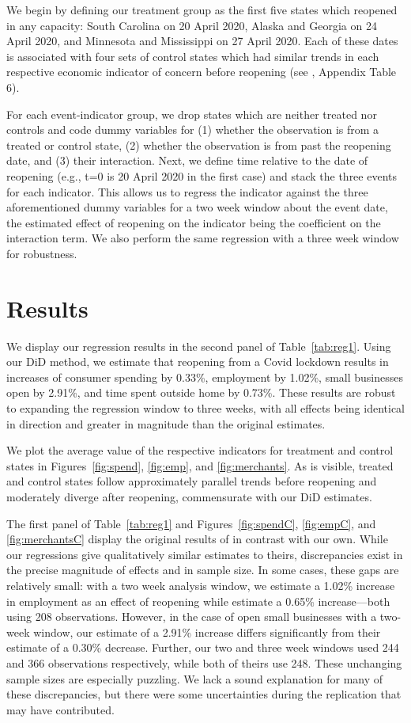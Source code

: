 \documentclass[12pt,letterpaper]{article}
\begin{document}
We begin by defining our treatment group as the first five states which reopened in any capacity: South Carolina on 20 April 2020, Alaska and Georgia on 24 April 2020, and Minnesota and Mississippi on 27 April 2020. Each of these dates is associated with four sets of control states which had similar trends in each respective economic indicator of concern before reopening (see \citeauthor{Chetty2020}, Appendix Table 6).

For each event-indicator group, we drop states which are neither treated nor controls and code dummy variables for (1) whether the observation is from a treated or control state, (2) whether the observation is from past the reopening date, and (3) their interaction. Next, we define time relative to the date of reopening (e.g., t=0 is 20 April 2020 in the first case) and stack the three events for each indicator. This allows us to regress the indicator against the three aforementioned dummy variables for a two week window about the event date, the estimated effect of reopening on the indicator being the coefficient on the interaction term. We also perform the same regression with a three week window for robustness.

\section*{Results}
We display our regression results in the second panel of Table~\ref{tab:reg1}. Using our DiD method, we estimate that reopening from a Covid lockdown results in increases of consumer spending by 0.33\%, employment by 1.02\%, small businesses open by 2.91\%, and time spent outside home by 0.73\%. These results are robust to expanding the regression window to three weeks, with all effects being identical in direction and greater in magnitude than the original estimates.

We plot the average value of the respective indicators for treatment and control states in Figures~\ref{fig:spend}, \ref{fig:emp}, and \ref{fig:merchants}. As is visible, treated and control states follow approximately parallel trends before reopening and moderately diverge after reopening, commensurate with our DiD estimates.

The first panel of Table~\ref{tab:reg1} and Figures~\ref{fig:spendC}, \ref{fig:empC}, and \ref{fig:merchantsC} display the original results of \citeauthor{Chetty2020} in contrast with our own. While our regressions give qualitatively similar estimates to theirs, discrepancies exist in the precise magnitude of effects and in sample size. In some cases, these gaps are relatively small: with a two week analysis window, we estimate a 1.02\% increase in employment as an effect of reopening while \citeauthor{Chetty2020} estimate a 0.65\% increase—both using 208 observations. However, in the case of open small businesses with a two-week window, our estimate of a 2.91\% increase differs significantly from their estimate of a 0.30\% decrease. Further, our two and three week windows used 244 and 366 observations respectively, while both of theirs use 248. These unchanging sample sizes are especially puzzling. We lack a sound explanation for many of these discrepancies, but there were some uncertainties during the replication that may have contributed.
\end{document}
